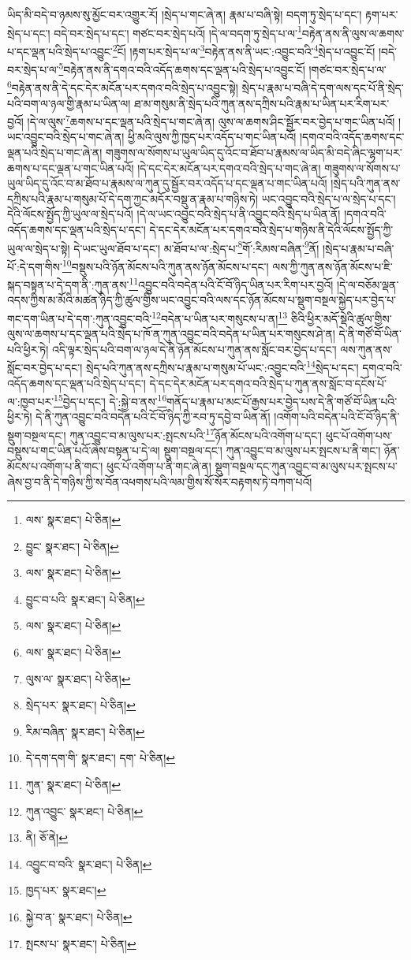 ཡིད་མི་བདེ་བ་ཉམས་སུ་མྱོང་བར་འགྱུར་རོ། །སྲེད་པ་གང་ཞེ་ན། རྣམ་པ་བཞི་སྟེ། བདག་ཏུ་སྲེད་པ་དང་། རྟག་པར་སྲེད་པ་དང་། བདེ་བར་སྲེད་པ་དང་། གཙང་བར་སྲེད་པའོ། །དེ་ལ་བདག་ཏུ་སྲེད་པ་ལ་\footnote{ལས་  སྣར་ཐང་།  པེ་ཅིན། }བརྟེན་ནས་ནི་ལུས་ལ་ཆགས་པ་དང་ལྡན་པའི་སྲེད་པ་འབྱུང་\footnote{བྱུང་  སྣར་ཐང་།  པེ་ཅིན། }ངོ། །རྟག་པར་སྲེད་པ་ལ་\footnote{ལས་  སྣར་ཐང་།  པེ་ཅིན། }བརྟེན་ནས་ནི་ཡང་:འབྱུང་བའི་\footnote{བྱུང་བ་པའི་  སྣར་ཐང་།  པེ་ཅིན། }སྲེད་པ་འབྱུང་ངོ། །བདེ་བར་སྲེད་པ་ལ་\footnote{ལས་  སྣར་ཐང་།  པེ་ཅིན། }བརྟེན་ནས་ནི་དགའ་བའི་འདོད་ཆགས་དང་ལྡན་པའི་སྲེད་པ་འབྱུང་ངོ། །གཙང་བར་སྲེད་པ་ལ་\footnote{ལས་  སྣར་ཐང་།  པེ་ཅིན། }བརྟེན་ནས་ནི་དེ་དང་དེར་མངོན་པར་དགའ་བའི་སྲེད་པ་འབྱུང་སྟེ། སྲེད་པ་རྣམ་པ་བཞི་དེ་དག་ལས་དང་པོ་ནི་སྲེད་པའི་བག་ལ་ཉལ་གྱི་རྣམ་པ་ཡིན་ལ། ཐ་མ་གསུམ་ནི་སྲེད་པའི་ཀུན་ནས་དཀྲིས་པའི་རྣམ་པ་ཡིན་པར་རིག་པར་བྱའོ། །དེ་ལ་ལུས་\footnote{ལུས་ལ་  སྣར་ཐང་།  པེ་ཅིན། }ཆགས་པ་དང་ལྡན་པའི་སྲེད་པ་གང་ཞེ་ན། ལུས་ལ་ཆགས་ཤིང་སྦྱོར་བར་བྱེད་པ་གང་ཡིན་པའོ། །ཡང་འབྱུང་བའི་སྲེད་པ་གང་ཞེ་ན། ཕྱི་མའི་ལུས་ཀྱི་ཁྱད་པར་འདོད་པ་གང་ཡིན་པའོ། །དགའ་བའི་འདོད་ཆགས་དང་ལྡན་པའི་སྲེད་པ་གང་ཞེ་ན། གཟུགས་ལ་སོགས་པ་ཡུལ་ཡིད་དུ་འོང་བ་ཐོབ་པ་རྣམས་ལ་ཡིད་མི་བདེ་ཞིང་ལྷག་པར་ཆགས་པ་དང་ལྡན་པ་གང་ཡིན་པའོ། །དེ་དང་དེར་མངོན་པར་དགའ་བའི་སྲེད་པ་གང་ཞེ་ན། གཟུགས་ལ་སོགས་པ་ཡུལ་ཡིད་དུ་འོང་བ་མ་ཐོབ་པ་རྣམས་ལ་ཀུན་དུ་སྦྱོར་བར་འདོད་པ་དང་ལྡན་པ་གང་ཡིན་པའོ། །སྲེད་པའི་ཀུན་ནས་དཀྲིས་པའི་རྣམ་པ་གསུམ་པོ་དེ་དག་ཀྱང་མདོར་བསྡུ་ན་རྣམ་པ་གཉིས་ཏེ། ཡང་འབྱུང་བའི་སྲེད་པ་ལ་སྲེད་པ་དང་། དེའི་ལོངས་སྤྱོད་ཀྱི་ཡུལ་ལ་སྲེད་པའོ། །དེ་ལ་ཡང་འབྱུང་བའི་སྲེད་པ་ནི་འབྱུང་བའི་སྲེད་པ་ཡིན་ནོ། །དགའ་བའི་འདོད་ཆགས་དང་ལྡན་པའི་སྲེད་པ་དང་། དེ་དང་དེར་མངོན་པར་དགའ་བའི་སྲེད་པ་གཉིས་ནི་དེའི་ལོངས་སྤྱོད་ཀྱི་ཡུལ་ལ་སྲེད་པ་སྟེ། དེ་ཡང་ཡུལ་ཐོབ་པ་དང་། མ་ཐོབ་པ་ལ་:སྲེད་པ་\footnote{སྲེད་པར་  སྣར་ཐང་།  པེ་ཅིན། }གོ་:རིམས་བཞིན་\footnote{རིམ་བཞིན་  སྣར་ཐང་།  པེ་ཅིན། }ནོ། །སྲེད་པ་རྣམ་པ་བཞི་པོ་:དེ་དག་གིས་\footnote{དེ་དག་དག་གི་  སྣར་ཐང་། དག་  པེ་ཅིན། }བསྡུས་པའི་ཉོན་མོངས་པའི་ཀུན་ནས་ཉོན་མོངས་པ་དང་། ལས་ཀྱི་ཀུན་ནས་ཉོན་མོངས་པ་ཇི་སྐད་བསྟན་པ་དེ་དག་ནི་:ཀུན་ནས་\footnote{ཀུན་  སྣར་ཐང་།  པེ་ཅིན། }འབྱུང་བའི་བདེན་པའི་ངོ་བོ་ཉིད་ཡིན་པར་རིག་པར་བྱའོ། །དེ་ལ་བཅོམ་ལྡན་འདས་ཀྱིས་མ་མོའི་མཚན་ཉིད་ཀྱི་ཚུལ་གྱིས་ཡང་འབྱུང་བའི་ལས་དང་ཉོན་མོངས་པ་སྡུག་བསྔལ་སྐྱེད་པར་བྱེད་པ་གང་དག་ཡིན་པ་དེ་དག་:ཀུན་འབྱུང་བའི་\footnote{ཀུན་འབྱུང་  སྣར་ཐང་།  པེ་ཅིན། }བདེན་པ་ཡིན་པར་གསུངས་པ་ན།\footnote{ནི།  ཅོ་ནེ། } ཅིའི་ཕྱིར་མདོ་སྡེའི་ཚུལ་གྱིས་ལུས་ལ་ཆགས་པ་དང་ལྡན་པའི་སྲེད་པ་ཁོ་ན་ཀུན་འབྱུང་བའི་བདེན་པ་ཡིན་པར་གསུངས་ཤེ་ན། དེ་ནི་གཙོ་བོ་ཡིན་པའི་ཕྱིར་ཏེ། འདི་ལྟར་སྲེད་པའི་བག་ལ་ཉལ་དེ་ནི་ཉོན་མོངས་པ་ཀུན་ནས་སློང་བར་བྱེད་པ་དང་། ལས་ཀུན་ནས་སློང་བར་བྱེད་པ་དང་། སྲེད་པའི་ཀུན་ནས་དཀྲིས་པ་རྣམ་པ་གསུམ་པོ་ཡང་:འབྱུང་བའི་\footnote{འབྱུང་བ་བའི་  སྣར་ཐང་།  པེ་ཅིན། }སྲེད་པ་དང་། དགའ་བའི་འདོད་ཆགས་དང་ལྡན་པའི་སྲེད་པ་དང་། དེ་དང་དེར་མངོན་པར་དགའ་བའི་སྲེད་པ་ཀུན་ནས་སློང་བ་དངོས་པོ་ལ་:ཁྱབ་པར་\footnote{ཁྱད་པར་  སྣར་ཐང་། }བྱེད་པ་དང་། དེ་:སྐྱེ་བ་ནས་\footnote{སྐྱེ་བ་ན་  སྣར་ཐང་།  པེ་ཅིན། }གནོད་པ་རྣམ་པ་མང་པོ་རྒྱས་པར་བྱེད་པས་དེ་ནི་གཙོ་བོ་ཡིན་པའི་ཕྱིར་ཏེ། དེ་ནི་ཀུན་འབྱུང་བའི་བདེན་པའི་ངོ་བོ་ཉིད་ཀྱི་རབ་ཏུ་དབྱེ་བ་ཡིན་ནོ། །འགོག་པའི་བདེན་པའི་ངོ་བོ་ཉིད་ནི་སྡུག་བསྔལ་དང་། ཀུན་འབྱུང་བ་མ་ལུས་པར་:སྤངས་པའི་\footnote{སྤངས་པ་  སྣར་ཐང་།  པེ་ཅིན། }ཉོན་མོངས་པའི་འགོག་པ་དང་། ཕུང་པོ་འགོག་པས་བསྡུས་པ་གང་ཡིན་པའོ་ཞེས་བསྟན་པ་དེ་ལ། སྡུག་བསྔལ་དང་། ཀུན་འབྱུང་བ་མ་ལུས་པར་སྤངས་པ་ནི་གང་། ཉོན་མོངས་པ་འགོག་པ་ནི་གང་། ཕུང་པོ་འགོག་པ་ནི་གང་ཞེ་ན། སྡུག་བསྔལ་དང་ཀུན་འབྱུང་བ་མ་ལུས་པར་སྤངས་པ་ཞེས་བྱ་བ་ནི་དེ་གཉིས་ཀྱི་ས་བོན་འཕགས་པའི་ལམ་གྱིས་སོ་སོར་བརྟགས་ཏེ་བཀག་པའོ། 